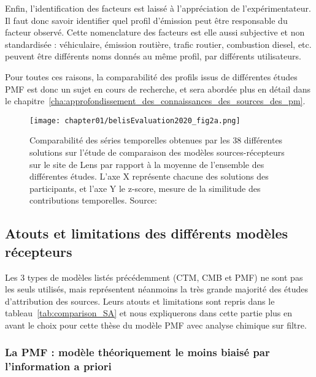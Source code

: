 Enfin, l'identification des facteurs est laissé à l'appréciation de l'expérimentateur. Il
faut donc savoir identifier quel profil d'émission peut être responsable du facteur
observé. Cette nomenclature des facteurs est elle aussi subjective et non standardisée :
véhiculaire, émission routière, trafic routier, combustion diesel, etc. peuvent être
différents noms donnés au même profil, par différents utilisateurs.

Pour toutes ces raisons, la comparabilité des profils issus de différentes études PMF
est donc un sujet en cours de recherche, et sera abordée plus en détail dans le
chapitre~\ref{cha:approfondissement_des_connaissances_des_sources_des_pm}.

\begin{figure}[ht]
    \centering
    \texttt{[image: chapter01/belisEvaluation2020\_fig2a.png]}
    \caption{Comparabilité des séries temporelles obtenues par les 38 différentes solutions
    sur l'étude de comparaison des modèles sources-récepteurs sur le site de Lens par
    rapport à la moyenne de l'ensemble des différentes études. L'axe X représente chacune des
    solutions des participants, et l'axe Y le z-score, mesure de la similitude des
contributions temporelles. Source: \cite{belisEvaluation2020}}%
    \label{fig:chapter01/belisEvaluation2020_fig2a}
\end{figure}

\subsection{Atouts et limitations des différents modèles récepteurs}%
\label{ssub:atouts_et_limitations_des_différents_modèles_récepteurs}

Les 3 types de modèles listés précédemment (CTM, CMB et PMF) ne sont pas les seuls
utilisés, mais représentent néanmoins la très grande majorité des études d'attribution
des sources. Leurs atouts et limitations sont repris dans le
tableau~\ref{tab:comparison_SA} et nous expliquerons dans cette partie plus en avant le
choix pour cette thèse du modèle PMF avec analyse chimique sur filtre.

\subsubsection{La PMF : modèle théoriquement le moins biaisé par l'information a priori}%
\label{ssub:choix_du_modèle_pmf}

